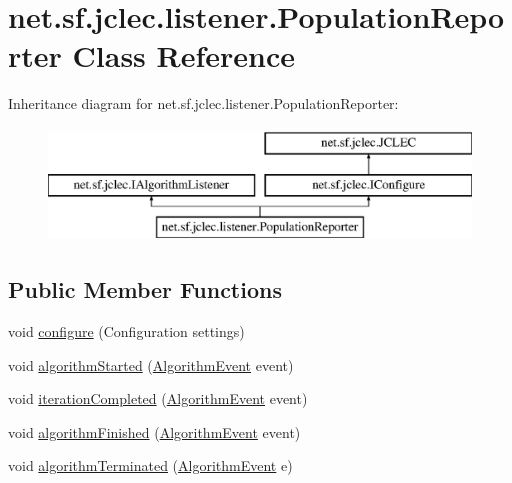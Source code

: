 \hypertarget{classnet_1_1sf_1_1jclec_1_1listener_1_1_population_reporter}{\section{net.\-sf.\-jclec.\-listener.\-Population\-Reporter Class Reference}
\label{classnet_1_1sf_1_1jclec_1_1listener_1_1_population_reporter}
}
Inheritance diagram for net.\-sf.\-jclec.\-listener.\-Population\-Reporter\-:\begin{figure}[H]
\begin{center}
\leavevmode
\includegraphics[height=3.000000cm]{classnet_1_1sf_1_1jclec_1_1listener_1_1_population_reporter}
\end{center}
\end{figure}
\subsection*{Public Member Functions}
\begin{DoxyCompactItemize}
\item 
void \hyperlink{classnet_1_1sf_1_1jclec_1_1listener_1_1_population_reporter_a75ba3c173a5eb863f11477ac9bda1d6d}{configure} (Configuration settings)
\item 
void \hyperlink{classnet_1_1sf_1_1jclec_1_1listener_1_1_population_reporter_a8a431829c199f6d45007c385ca85cf29}{algorithm\-Started} (\hyperlink{classnet_1_1sf_1_1jclec_1_1_algorithm_event}{Algorithm\-Event} event)
\item 
void \hyperlink{classnet_1_1sf_1_1jclec_1_1listener_1_1_population_reporter_aed679fe96d46074859a369ac899ef85c}{iteration\-Completed} (\hyperlink{classnet_1_1sf_1_1jclec_1_1_algorithm_event}{Algorithm\-Event} event)
\item 
void \hyperlink{classnet_1_1sf_1_1jclec_1_1listener_1_1_population_reporter_aaa7888feee87dcd8e330cf896976da45}{algorithm\-Finished} (\hyperlink{classnet_1_1sf_1_1jclec_1_1_algorithm_event}{Algorithm\-Event} event)
\item 
void \hyperlink{classnet_1_1sf_1_1jclec_1_1listener_1_1_population_reporter_a5ca186fb0818c6da3f60c24fb7a4208a}{algorithm\-Terminated} (\hyperlink{classnet_1_1sf_1_1jclec_1_1_algorithm_event}{Algorithm\-Event} e)
\end{DoxyCompactItemize}


